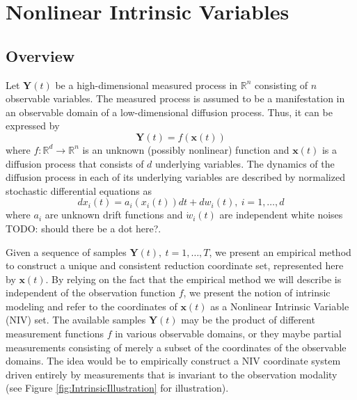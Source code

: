 \documentclass[aip,jcp,reprint,twocolumn]{revtex4-1}
\begin{document}
\section{Nonlinear Intrinsic Variables} \label{sec:NIV}

\subsection{Overview}
Let $\mathbf{Y}(t)$ be a high-dimensional measured process in $\mathbb{R}^n$ consisting of $n$ observable variables.
The measured process is assumed to be a manifestation in an observable domain of a low-dimensional diffusion process. Thus, it can be expressed by
\begin{equation}
	\mathbf{Y}(t) = f(\mathbf{x}(t))
\end{equation}
where $f:\mathbb{R}^d \rightarrow \mathbb{R}^n$ is an unknown (possibly nonlinear) function and $\mathbf{x}(t)$ is a diffusion process that consists of $d$ underlying variables.
%
The dynamics of the diffusion process in each of its underlying variables are described by normalized stochastic differential equations as
\begin{equation}
	d x_i(t) = a_i (x_i(t)) dt + d w_i(t), \ i=1,\ldots,d
\end{equation}
where $a_i$ are unknown drift functions and $\dot{w}_i(t)$ are independent white noises TODO: should there be a dot here?.

Given a sequence of samples $\mathbf{Y}(t), \ t=1,\ldots,T$, we present an empirical method to construct a unique and consistent reduction coordinate set, represented here by $\mathbf{x}(t)$. 
%
By relying on the fact that the empirical method we will describe is independent of the observation function $f$, we present the notion of intrinsic modeling and refer to the coordinates of $\mathbf{x}(t)$ as a Nonlinear Intrinsic Variable (NIV) set.
%
The available samples $\mathbf{Y}(t)$ may be the product of different measurement functions $f$ in various observable domains, or they maybe partial measurements consisting of merely a subset of the coordinates of the observable domains.
%
The idea would be to empirically construct a NIV coordinate system driven entirely by measurements that is invariant to the observation modality (see Figure \ref{fig:IntrinsicIllustration} for illustration).
\end{document}
